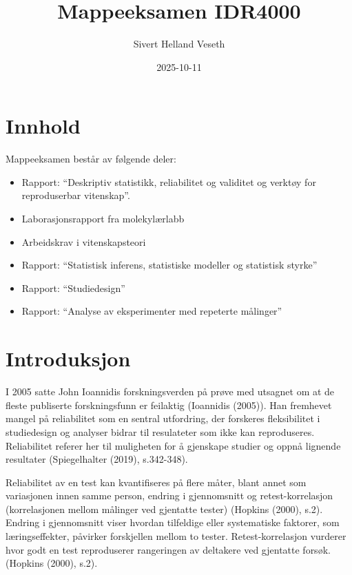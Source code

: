 \documentclass[
  letterpaper,
  DIV=11,
  numbers=noendperiod]{scrreprt}
\title{Mappeeksamen IDR4000}
\author{Sivert Helland Veseth}
\date{2025-10-11}
\providecommand{\tightlist}{%
  \setlength{\itemsep}{0pt}\setlength{\parskip}{0pt}}\usepackage{longtable,booktabs,array}
\renewcommand*\contentsname{Table of contents}
\newcommand\contentsname{Table of contents}
\begin{document}
\maketitle

\renewcommand*\contentsname{Table of contents}
{
\hypersetup{linkcolor=}
\setcounter{tocdepth}{2}
\tableofcontents
}


\chapter{Innhold}\label{innhold}

Mappeeksamen består av følgende deler:

\begin{itemize}
\tightlist
\item
  Rapport: ``Deskriptiv statistikk, reliabilitet og validitet og verktøy
  for reproduserbar vitenskap''.
\item
  Laborasjonsrapport fra molekylærlabb
\item
  Arbeidskrav i vitenskapsteori
\item
  Rapport: ``Statistisk inferens, statistiske modeller og statistisk
  styrke''
\item
  Rapport: ``Studiedesign''
\item
  Rapport: ``Analyse av eksperimenter med repeterte målinger''
\end{itemize}


\chapter{Introduksjon}\label{introduksjon}

I 2005 satte John Ioannidis forskningsverden på prøve med utsagnet om at
de fleste publiserte forskningsfunn er feilaktig (Ioannidis (2005)). Han
fremhevet mangel på reliabilitet som en sentral utfordring, der
forskeres fleksibilitet i studiedesign og analyser bidrar til
resulateter som ikke kan reproduseres. Reliabilitet referer her til
muligheten for å gjenskape studier og oppnå lignende resultater
(Spiegelhalter (2019), s.342-348).

Reliabilitet av en test kan kvantifiseres på flere måter, blant annet
som variasjonen innen samme person, endring i gjennomsnitt og
retest-korrelasjon (korrelasjonen mellom målinger ved gjentatte tester)
(Hopkins (2000), s.2). Endring i gjennomsnitt viser hvordan tilfeldige
eller systematiske faktorer, som læringseffekter, påvirker forskjellen
mellom to tester. Retest-korrelasjon vurderer hvor godt en test
reproduserer rangeringen av deltakere ved gjentatte forsøk. (Hopkins
(2000), s.2).
\end{document}
